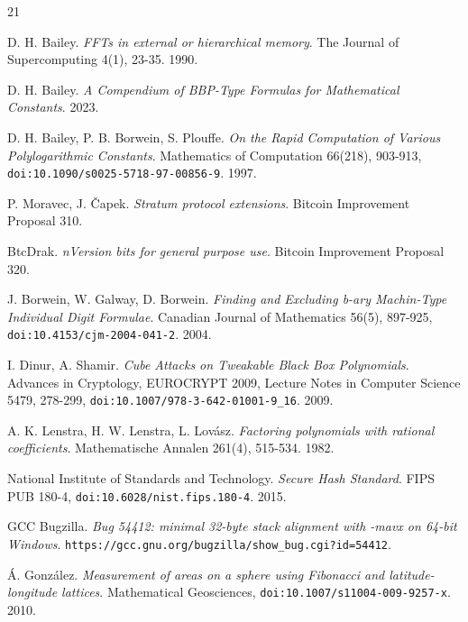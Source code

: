 \backmatter
{}
\begin{thebibliography}{21}

D. H. Bailey. \emph{FFTs in external or hierarchical memory}. The Journal of Supercomputing 4(1), 23-35. 1990.

D. H. Bailey. \emph{A Compendium of BBP-Type Formulas for Mathematical Constants}. 2023.

D. H. Bailey, P. B. Borwein, S. Plouffe. \emph{On the Rapid Computation of Various Polylogarithmic Constants}. Mathematics of Computation 66(218), 903-913, \texttt{doi:10.1090/\allowbreak{}s0025-5718-97-00856-9}. 1997.

P. Moravec, J. \v{C}apek. \emph{Stratum protocol extensions}. Bitcoin Improvement Proposal 310.

BtcDrak. \emph{nVersion bits for general purpose use}. Bitcoin Improvement Proposal 320.

J. Borwein, W. Galway, D. Borwein. \emph{Finding and Excluding b-ary Machin-Type Individual Digit Formulae}. Canadian Journal of Mathematics 56(5), 897-925, \texttt{doi:10.4153/\allowbreak{}cjm-2004-041-2}. 2004.

I. Dinur, A. Shamir. \emph{Cube Attacks on Tweakable Black Box Polynomials}. Advances in Cryptology, EUROCRYPT 2009, Lecture Notes in Computer Science 5479, 278-299, \texttt{doi:10.1007/\allowbreak{}978-3-642-01001-9\_\allowbreak{}16}. 2009.

A. K. Lenstra, H. W. Lenstra, L. Lov\'asz. \emph{Factoring polynomials with rational coefficients}. Mathematische Annalen 261(4), 515-534. 1982.

National Institute of Standards and Technology. \emph{Secure Hash Standard}. FIPS PUB 180-4, \texttt{doi:10.6028/\allowbreak{}nist.fips.180-4}. 2015.

GCC Bugzilla. \emph{Bug 54412: minimal 32-byte stack alignment with -mavx on 64-bit Windows}. \texttt{https:/\allowbreak{}/\allowbreak{}gcc.gnu.org/\allowbreak{}bugzilla/\allowbreak{}show\_\allowbreak{}bug.cgi?id=54412}.

\'A. Gonz\'alez. \emph{Measurement of areas on a sphere using Fibonacci and latitude-longitude lattices}. Mathematical Geosciences, \texttt{doi:10.1007/\allowbreak{}s11004-009-9257-x}. 2010.


\end{thebibliography}
